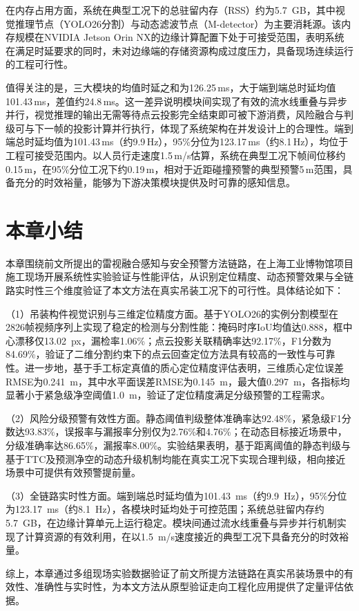 在内存占用方面，系统在典型工况下的总驻留内存（RSS）约为5.7~GB，其中视觉推理节点（YOLO26分割）与动态滤波节点（M-detector）为主要消耗源。该内存规模在NVIDIA Jetson Orin NX的边缘计算配置下处于可接受范围，表明系统在满足时延要求的同时，未对边缘端的存储资源构成过度压力，具备现场连续运行的工程可行性。

值得关注的是，三大模块的均值时延之和为126.25\,ms，大于端到端总时延均值101.43\,ms，差值约24.8\,ms。这一差异说明模块间实现了有效的流水线重叠与异步并行，视觉推理的输出无需等待点云投影完全结束即可被下游消费，风险融合与判级可与下一帧的投影计算并行执行，体现了系统架构在并发设计上的合理性。端到端总时延均值为101.43\,ms（约9.9\,Hz），95\%分位为123.17\,ms（约8.1\,Hz），均位于工程可接受范围内。以人员行走速度1.5\,m/s估算，系统在典型工况下帧间位移约0.15\,m，在95\%分位工况下约0.19\,m，相对于近距碰撞预警的典型预警5\,m范围，具备充分的时效裕量，能够为下游决策模块提供及时可靠的感知信息。

\section{本章小结}\label{sec:ch6_summary}

本章围绕前文所提出的雷视融合感知与安全预警方法链路，在上海工业博物馆项目施工现场开展系统性实验验证与性能评估，从识别定位精度、动态预警效果与全链路实时性三个维度验证了本文方法在真实吊装工况下的可行性。具体结论如下：

（1）吊装构件视觉识别与三维定位精度方面。基于YOLO26的实例分割模型在2826帧视频序列上实现了稳定的检测与分割性能：掩码时序IoU均值达0.888，框中心漂移仅13.02~px，漏检率1.06\%；点云投影关联精确率达92.17\%，F1分数为84.69\%，验证了二维分割约束下的点云回查定位方法具有较高的一致性与可靠性。进一步地，基于手工标定真值的质心定位精度评估表明，三维质心定位误差RMSE为0.241~m，其中水平面误差RMSE为0.145~m，最大值0.297~m，各指标均显著小于紧急级净空阈值1.0~m，验证了定位精度满足分级预警的工程需求。

（2）风险分级预警有效性方面。静态阈值判级整体准确率达92.48\%，紧急级F1分数达93.83\%，误报率与漏报率分别仅为2.76\%和4.76\%；在动态目标接近场景中，分级准确率达86.65\%，漏报率8.00\%。实验结果表明，基于距离阈值的静态判级与基于TTC及预测净空的动态升级机制均能在真实工况下实现合理判级，相向接近场景中可提供有效预警提前量。

（3）全链路实时性方面。端到端总时延均值为101.43~ms（约9.9~Hz），95\%分位为123.17~ms（约8.1~Hz），各模块时延均处于可控范围；系统总驻留内存约5.7~GB，在边缘计算单元上运行稳定。模块间通过流水线重叠与异步并行机制实现了计算资源的有效利用，在以1.5~m/s速度接近的典型工况下具备充分的时效裕量。

综上，本章通过多组现场实验数据验证了前文所提方法链路在真实吊装场景中的有效性、准确性与实时性，为本文方法从原型验证走向工程化应用提供了定量评估依据。


